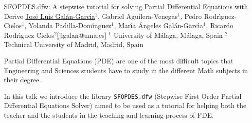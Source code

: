 


\begin{abstract_online}{SFOPDES.dfw: A stepwise tutorial for solving Partial Differential Equations with {\sc Derive}}{%
        \underline{Jos\'e Luis Gal\'an-Garc\'{\i}a}$^{1}$, Gabriel Aguilera-Venegas$^{1}$, Pedro Rodr\'{\i}guez-Cielos$^{1}$, Yolanda Padilla-Dom\'{\i}nguez$^{1}$, Mar\'{\i}a \'Angeles Gal\'an-Garc\'{\i}a$^{1}$, Ricardo Rodr\'{\i}guez-Cielos$^{2}$}{[jlgalan@uma.es]
        }{%
        $^1$ University of M\'alaga, M\'alaga, Spain \newline{}$^2$ Technical University of Madrid, Madrid, Spain
}
    
Partial Differential Equations (PDE) are one of the most difficult topics that Engineering and Sciences students have to study in the different Math subjects in their degree.

In this talk we introduce the library {\tt SFOPDES.dfw} (Stepwise First Order Partial Differential Equations Solver) aimed to be used as a tutorial for helping both the teacher and the students in the teaching and learning process of PDE.


\end{abstract_online}
